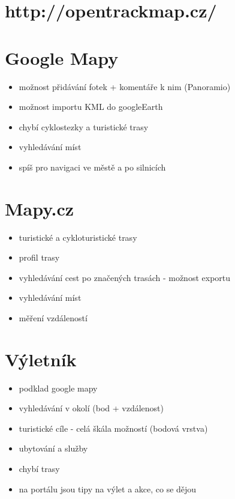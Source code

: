 \documentclass[11pt,a4paper,titlepage,oneside]{book}
\begin{document}
	\section{http://opentrackmap.cz/}
	
	\section{Google Mapy}
		\begin{itemize}
			\item možnost přidávání fotek + komentáře k nim (Panoramio)
			\item možnost importu KML do googleEarth
			\item chybí cyklostezky a turistické trasy
			\item vyhledávání míst
			\item spíš pro navigaci ve městě a po silnicích
		\end{itemize}

	\section{Mapy.cz}
		\begin{itemize}
			\item turistické a cykloturistické trasy
			\item profil trasy
			\item vyhledávání cest po značených trasách - možnost exportu
			\item vyhledávání míst
			\item měření vzdáleností
		\end{itemize}

	\section{Výletník}
		\begin{itemize}
			\item podklad google mapy
			\item vyhledávání v okolí (bod + vzdálenost)
			\item turistické cíle - celá škála možností (bodová vrstva)
			\item ubytování a služby
			\item chybí trasy
			\item na portálu jsou tipy na výlet a akce, co se dějou
		\end{itemize}
	
\end{document}
